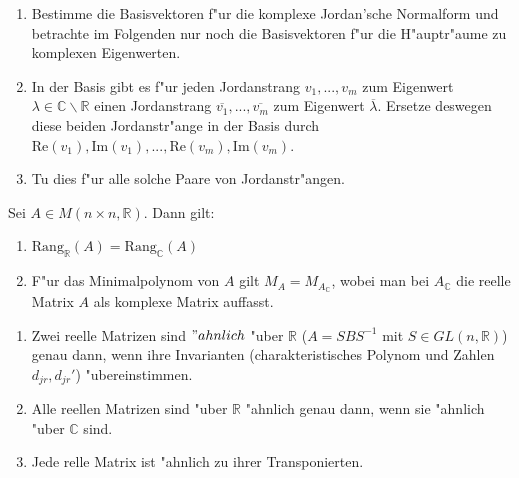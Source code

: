 \documentclass[8pt, a4paper, twocolumn, landscape]{article}
\begin{document}
\begin{remark}  
\begin{enumerate}
\item Bestimme die Basisvektoren f"ur die komplexe Jordan'sche Normalform und betrachte im Folgenden nur noch die Basisvektoren f"ur die H"auptr"aume zu komplexen Eigenwerten.
\item In der Basis gibt es f"ur jeden Jordanstrang $v_1, ..., v_m$ zum Eigenwert $\lambda \in \mathbb{C} \backslash \mathbb{R}$ einen Jordanstrang $\overline{v_1}, ..., \overline{v_m}$ zum Eigenwert $\overline{\lambda}$. Ersetze deswegen diese beiden Jordanstr"ange in der Basis durch $\mathrm{Re}(v_1), \mathrm{Im}(v_1),..., \mathrm{Re}(v_m), \mathrm{Im}(v_m)$. 
\item Tu dies f"ur alle solche Paare von Jordanstr"angen.
\end{enumerate}
\end{remark}









\begin{lemma}
Sei $A \in M(n \times n, \mathbb{R})$. Dann gilt:
\begin{enumerate}
\item $\mathrm{Rang}_\mathbb{R}(A) = \mathrm{Rang}_\mathbb{C}(A)$
\item F"ur das Minimalpolynom von $A$ gilt $M_A = M_{A_\mathbb{C}}$, wobei man bei $A_\mathbb{C}$ die reelle Matrix $A$ als komplexe Matrix auffasst.
\end{enumerate}
\end{lemma}
\begin{corollary}
\begin{enumerate}
\item Zwei reelle Matrizen sind $"ahnlich$ "uber $\mathbb{R}$ ($A = S B S^{-1}$ mit $S \in GL(n, \mathbb{R})$) genau dann, wenn ihre Invarianten (charakteristisches Polynom und Zahlen $d_{jr}, d_{jr}'$) "ubereinstimmen.
\item Alle reellen Matrizen sind "uber $\mathbb{R}$ "ahnlich genau dann, wenn sie "ahnlich "uber $\mathbb{C}$ sind.
\item  Jede relle Matrix ist "ahnlich zu ihrer Transponierten. 
\end{enumerate}
\end{corollary}
\end{document}
